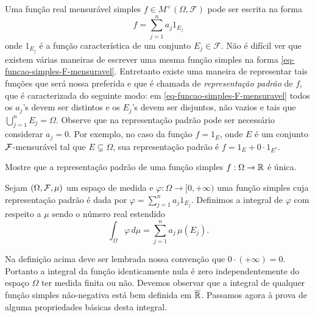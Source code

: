 Uma função real  mensurável simples 
$f\in M^{+}(\Omega,\mathcal{F})$ 
pode ser escrita na forma 
\begin{equation}\label{eq-funcao-simples-F-mensuravel}
f=\sum_{j=1}^{n}a_j 1_{E_j}
\end{equation}
onde $1_{E_j}$ é a função característica de um conjunto $E_j\in \mathcal{F}$. 
Não é difícil ver que existem várias maneiras de 
escrever uma mesma função simples na 
forma \eqref{eq-funcao-simples-F-mensuravel}. 
Entretanto existe uma maneira de
representar tais funções que será nossa preferida 
e que é chamada de
\emph{representação padrão}
 de $f$, 
que é caracterizada do seguinte modo: 
em \eqref{eq-funcao-simples-F-mensuravel} 
todos os $a_j$'s devem ser distintos e os $E_j$'s devem ser disjuntos, 
não vazios e tais que $\bigcup_{j=1}^nE_j=\Omega$. 
Observe que na representação padrão pode ser necessário
considerar $a_j=0$. Por exemplo, no caso da função 
$f = 1_{E}$, onde $E$ é um conjunto $\mathcal{F}$-mensurável tal
que $E\subsetneq \Omega$, sua representação padrão 
é $f=1_{E} + 0\cdot 1_{E^c}$.
%
%
\begin{exercicio}
Mostre que a representação padrão de uma função 
simples $f:\Omega\to\mathbb{R}$ é única.
\end{exercicio}
%
%
%
%
\begin{definicao}
\label{def-integral-funcao-simples-positiva}
Sejam $(\Omega,\mathcal{F},\mu)$ um espaço de medida e 
$\varphi:\Omega\to [0,+\infty)$ uma função simples cuja representação 
padrão é dada por $\varphi = \sum_{j=1}^n a_j1_{E_j}$.
Definimos a integral de $\varphi$ com respeito a $\mu$ 
sendo o número real estendido 
	\[
		\int_{\Omega} \varphi \, d\mu 
		=
		\sum_{j=1}^n a_j\, \mu(E_j).
	\]
\end{definicao}

Na definição acima deve ser lembrada nossa convenção 
que $0\cdot(+\infty)=0$. Portanto a integral da 
função identicamente nula é zero independentemente do 
espaço $\Omega$ ter medida finita ou não. 
Devemos observar que a integral de qualquer função 
simples não-negativa está bem definida em $\overline{\mathbb{R}}$.
Passamos agora à prova de alguma propriedades 
básicas desta integral.








